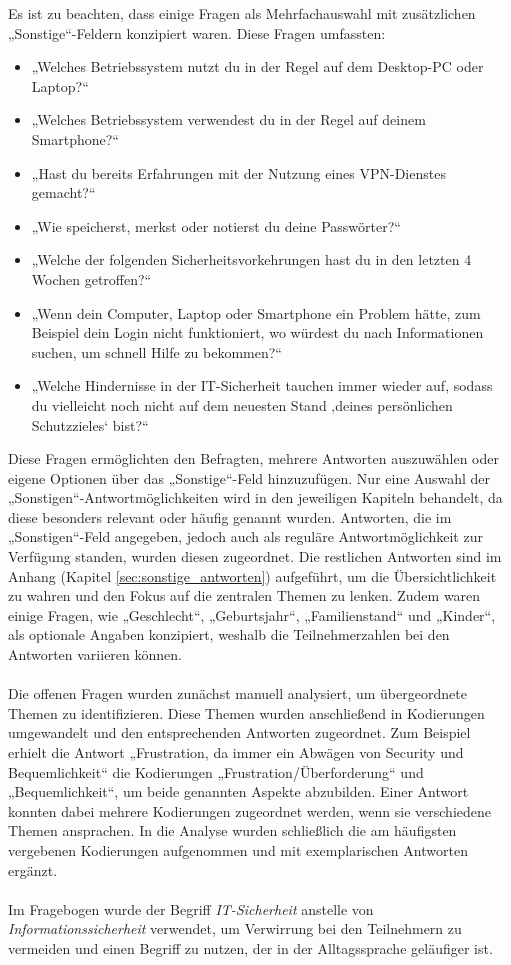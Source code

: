 \documentclass[german,report]{i1thesis}
\begin{document}
Es ist zu beachten, dass einige Fragen als Mehrfachauswahl mit zusätzlichen „Sonstige“-Feldern konzipiert waren. Diese Fragen umfassten:

\begin{itemize}
    \item „Welches Betriebssystem nutzt du in der Regel auf dem Desktop-PC oder Laptop?“
    \item „Welches Betriebssystem verwendest du in der Regel auf deinem Smartphone?“
    \item „Hast du bereits Erfahrungen mit der Nutzung eines VPN-Dienstes gemacht?“
    \item „Wie speicherst, merkst oder notierst du deine Passwörter?“
    \item „Welche der folgenden Sicherheitsvorkehrungen hast du in den letzten 4 Wochen getroffen?“
    \item „Wenn dein Computer, Laptop oder Smartphone ein Problem hätte, zum Beispiel dein Login nicht funktioniert, wo würdest du nach Informationen suchen, um schnell Hilfe zu bekommen?“
    \item „Welche Hindernisse in der IT-Sicherheit tauchen immer wieder auf, sodass du vielleicht noch nicht auf dem neuesten Stand ‚deines persönlichen Schutzzieles‘ bist?“
\end{itemize}

Diese Fragen ermöglichten den Befragten, mehrere Antworten auszuwählen oder eigene Optionen über das „Sonstige“-Feld hinzuzufügen. Nur eine Auswahl der „Sonstigen“-Antwortmöglichkeiten wird in den jeweiligen Kapiteln behandelt, da diese besonders relevant oder häufig genannt wurden. Antworten, die im „Sonstigen“-Feld angegeben, jedoch auch als reguläre Antwortmöglichkeit zur Verfügung standen, wurden diesen zugeordnet. Die restlichen Antworten sind im Anhang (Kapitel \ref{sec:sonstige_antworten}) aufgeführt, um die Übersichtlichkeit zu wahren und den Fokus auf die zentralen Themen zu lenken. Zudem waren einige Fragen, wie „Geschlecht“, „Geburtsjahr“, „Familienstand“ und „Kinder“, als optionale Angaben konzipiert, weshalb die Teilnehmerzahlen bei den Antworten variieren können.\\
\\
Die offenen Fragen wurden zunächst manuell analysiert, um übergeordnete Themen zu identifizieren. Diese Themen wurden anschließend in Kodierungen umgewandelt und den entsprechenden Antworten zugeordnet. Zum Beispiel erhielt die Antwort „Frustration, da immer ein Abwägen von Security und Bequemlichkeit“ die Kodierungen „Frustration/Überforderung“ und „Bequemlichkeit“, um beide genannten Aspekte abzubilden. Einer Antwort konnten dabei mehrere Kodierungen zugeordnet werden, wenn sie verschiedene Themen ansprachen. In die Analyse wurden schließlich die am häufigsten vergebenen Kodierungen aufgenommen und mit exemplarischen Antworten ergänzt.\\
\\
Im Fragebogen wurde der Begriff \textit{IT-Sicherheit} anstelle von \textit{Informationssicherheit} verwendet, um Verwirrung bei den Teilnehmern zu vermeiden und einen Begriff zu nutzen, der in der Alltagssprache geläufiger ist.
\end{document}
